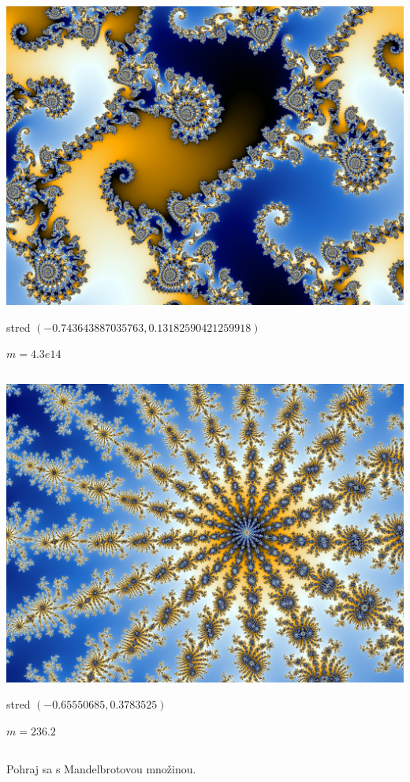 \begin{column}{0.45}
\vskip 0pt
\centerline{\includegraphics[width=1.1\textwidth]{data/mb3.png}}
\centerline{stred $(-0.743643887035763,0.13182590421259918)$}
\centerline{$m=4.3e14$}
\end{column}
\hfill
\begin{column}{0.45}
\vskip 0pt
\centerline{\includegraphics[width=1.1\textwidth]{data/mb4.png}}
\centerline{stred $(-0.65550685,0.3783525)$ }
\centerline{$m=236.2$}
\end{column}

\begin{uloha}
  Pohraj sa s Mandelbrotovou množinou.
\end{uloha}

